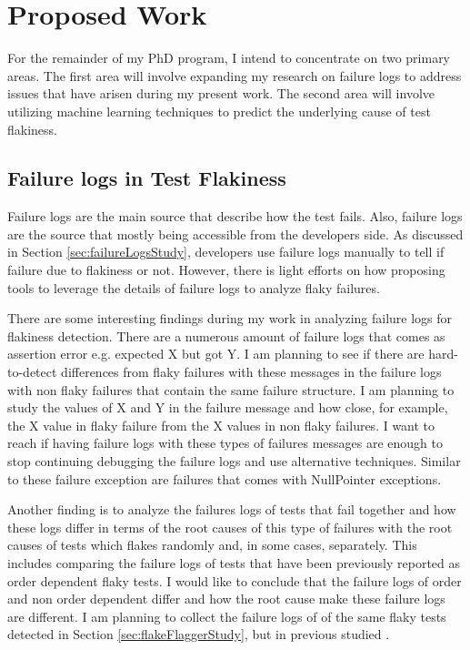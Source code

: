 \section{Proposed Work}
\label{sec:proposedWork}


For the remainder of my PhD program, I intend to concentrate on two primary areas. The first area will involve expanding my research on failure logs to address issues that have arisen during my present work. The second area will involve utilizing machine learning techniques to predict the underlying cause of test flakiness.


\subsection{Failure logs in Test Flakiness}

Failure logs are the main source that describe how the test fails. Also, failure logs are the source that mostly being accessible from the developers side. As discussed in Section \ref{sec:failureLogsStudy}, developers use failure logs manually to tell if failure due to flakiness or not. However, there is light efforts on how proposing tools to leverage the details of failure logs to analyze flaky failures. 

There are some interesting findings during my work in analyzing failure logs for flakiness detection. There are a numerous amount of failure logs that comes as assertion error e.g. expected X but got Y. I am planning to see if there are hard-to-detect differences from flaky failures with these messages in the failure logs with non flaky failures that contain the same failure structure. I am planning to study the values of X and Y in the failure message and how close, for example, the X value in flaky failure from the X values in non flaky failures. I want to reach if having failure logs with these types of failures messages are enough to stop continuing debugging the failure logs and use alternative techniques. Similar to these failure exception are failures that comes with NullPointer exceptions.

Another finding is to analyze the failures logs of tests that fail together and how these logs differ in terms of the root causes of this type of failures with the root causes of tests which flakes randomly and, in some cases, separately. This includes comparing the failure logs of tests that have been previously reported as order dependent flaky tests. I would like to conclude that the failure logs of order and non order dependent differ and how the root cause make these failure logs are different. I am planning to collect the failure logs of of the same flaky tests detected in Section \ref{sec:flakeFlaggerStudy}, but in previous studied \cite{lam2019idflakies}. 


